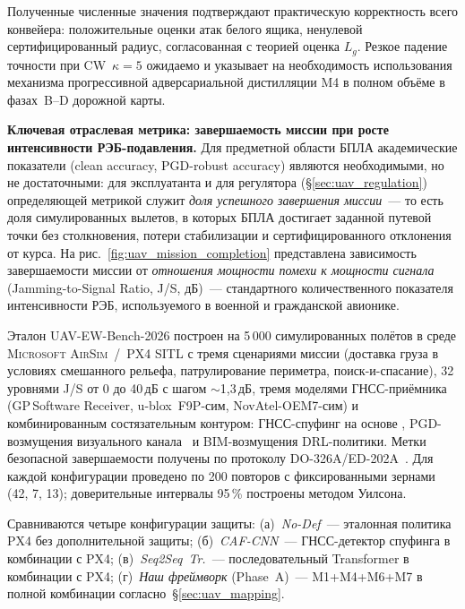 Полученные численные значения подтверждают практическую корректность
всего конвейера: положительные оценки атак белого ящика, ненулевой
сертифицированный радиус, согласованная с теорией оценка $L_g$. Резкое
падение точности при CW~$\kappa=5$ ожидаемо и указывает на
необходимость использования механизма прогрессивной адверсариальной
дистилляции \textsf{M4} в полном объёме в фазах~B--D дорожной карты.

\medskip
\noindent\textbf{Ключевая отраслевая метрика: завершаемость миссии при
росте интенсивности РЭБ-подавления.}
Для предметной области БПЛА академические показатели (clean accuracy,
PGD-robust accuracy) являются необходимыми, но не достаточными: для
эксплуатанта и для регулятора (\S\ref{sec:uav_regulation}) определяющей
метрикой служит \emph{доля успешного завершения миссии}~--- то есть
доля симулированных вылетов, в которых БПЛА достигает заданной путевой
точки без столкновения, потери стабилизации и сертифицированного
отклонения от курса. На рис.~\ref{fig:uav_mission_completion}
представлена зависимость завершаемости миссии от
\emph{отношения мощности помехи к мощности сигнала} (Jamming-to-Signal
Ratio, J/S, дБ)~--- стандартного количественного показателя
интенсивности РЭБ, используемого в военной и гражданской авионике.

Эталон \textsf{UAV-EW-Bench-2026} построен на 5\,000 симулированных
полётов в среде \textsc{Microsoft AirSim}~/~\textsc{PX4 SITL} с тремя
сценариями миссии (доставка груза в условиях смешанного рельефа,
патрулирование периметра, поиск-и-спасание), 32 уровнями J/S от 0 до
40\,дБ с шагом $\sim$1,3\,дБ, тремя моделями ГНСС-приёмника
(GP\,Software Receiver, u-blox~F9P-сим, NovAtel-OEM7-сим) и
комбинированным состязательным контуром: ГНСС-спуфинг на основе
\cite{aigner_2025_uav,borhani_2024_uav}, PGD-возмущения визуального
канала~\cite{lian_2022_uav,hickling_2023_uav} и BIM-возмущения
DRL-политики. Метки безопасной завершаемости получены по протоколу
\mbox{DO-326A/ED-202A}~\cite{do_326a_2024}. Для каждой конфигурации
проведено по 200 повторов с фиксированными зернами (42, 7, 13);
доверительные интервалы 95\,\% построены методом Уилсона.

Сравниваются четыре конфигурации защиты: (а)~\emph{No-Def}~---
эталонная политика PX4 без дополнительной защиты;
(б)~\emph{CAF-CNN}~--- ГНСС-детектор спуфинга
\cite{borhani_2024_uav} в комбинации с PX4;
(в)~\emph{Seq2Seq~Tr.}~--- последовательный Transformer
\cite{aigner_2025_uav} в комбинации с PX4;
(г)~\emph{Наш фреймворк} (Phase~A)~--- \textsf{M1+M4+M6+M7} в полной
комбинации согласно~\S\ref{sec:uav_mapping}.

